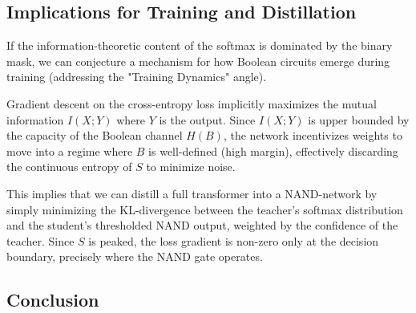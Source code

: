 \subsection{Implications for Training and Distillation}






If the information-theoretic content of the softmax is dominated by the binary mask, we can conjecture a mechanism for how Boolean circuits emerge during training (addressing the "Training Dynamics" angle).






\begin{conjecture}






Gradient descent on the cross-entropy loss implicitly maximizes the mutual information $I(X; Y)$ where $Y$ is the output. Since $I(X; Y)$ is upper bounded by the capacity of the Boolean channel $H(B)$, the network incentivizes weights to move into a regime where $B$ is well-defined (high margin), effectively discarding the continuous entropy of $S$ to minimize noise.






\end{conjecture}













This implies that we can distill a full transformer into a NAND-network by simply minimizing the KL-divergence between the teacher's softmax distribution and the student's thresholded NAND output, weighted by the confidence of the teacher. Since $S$ is peaked, the loss gradient is non-zero only at the decision boundary, precisely where the NAND gate operates.













\subsection{Conclusion}






